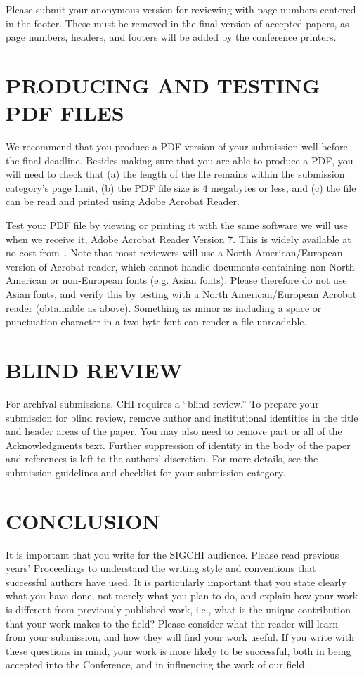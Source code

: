 \documentclass{chi2012}
\begin{document}
Please submit your anonymous version for reviewing with page numbers
centered in the footer.  These must be removed in the final version of
accepted papers, as page numbers, headers, and footers will be added
by the conference printers.

\section{PRODUCING AND TESTING PDF FILES}

We recommend that you produce a PDF version of your submission well
before the final deadline.  Besides making sure that you are able to
produce a PDF, you will need to check that (a) the length of the file
remains within the submission category's page limit, (b) the PDF file
size is 4 megabytes or less, and (c) the file can be read and printed
using Adobe Acrobat Reader.

Test your PDF file by viewing or printing it with the same software we
will use when we receive it, Adobe Acrobat Reader Version 7. This is
widely available at no cost from~\cite{acrobat}.  Note that most
reviewers will use a North American/European version of Acrobat
reader, which cannot handle documents containing non-North American or
non-European fonts (e.g. Asian fonts).  Please therefore do not use
Asian fonts, and verify this by testing with a North American/European
Acrobat reader (obtainable as above). Something as minor as including
a space or punctuation character in a two-byte font can render a file
unreadable.

\section{BLIND REVIEW}

For archival submissions, CHI requires a ``blind review.'' To prepare
your submission for blind review, remove author and institutional
identities in the title and header areas of the paper. You may also
need to remove part or all of the Acknowledgments text.  Further
suppression of identity in the body of the paper and references is
left to the authors' discretion. For more details, see the submission
guidelines and checklist for your submission category.

\section{CONCLUSION}

It is important that you write for the SIGCHI audience.  Please read
previous years' Proceedings to understand the writing style and
conventions that successful authors have used.  It is particularly
important that you state clearly what you have done, not merely what
you plan to do, and explain how your work is different from previously
published work, i.e., what is the unique contribution that your work
makes to the field?  Please consider what the reader will learn from
your submission, and how they will find your work useful.  If you
write with these questions in mind, your work is more likely to be
successful, both in being accepted into the Conference, and in
influencing the work of our field.
\end{document}
